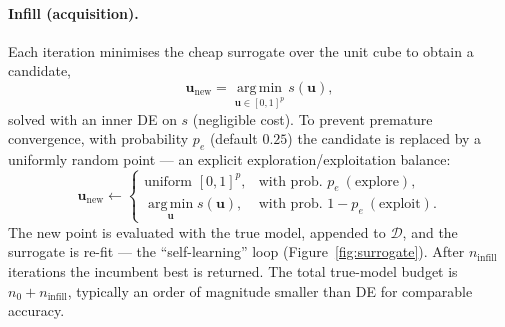 \documentclass[11pt]{article}
\begin{document}
\paragraph{Infill (acquisition).} Each iteration minimises the cheap surrogate over
the unit cube to obtain a candidate,
\begin{equation}
  \bm{u}_{\mathrm{new}}=\operatorname*{arg\,min}_{\bm{u}\in[0,1]^p} s(\bm{u}),
  \label{eq:infill}
\end{equation}
solved with an inner DE on $s$ (negligible cost). To prevent premature
convergence, with probability $p_e$ (default $0.25$) the candidate is replaced by a
uniformly random point --- an explicit exploration/exploitation balance:
\begin{equation}
  \bm{u}_{\mathrm{new}}\leftarrow
  \begin{cases}
    \text{uniform } [0,1]^p, & \text{with prob. } p_e \ (\text{explore}),\\[2pt]
    \operatorname*{arg\,min}_{\bm u} s(\bm u), & \text{with prob. } 1-p_e \ (\text{exploit}).
  \end{cases}
\end{equation}
The new point is evaluated with the true model, appended to $\mathcal{D}$, and the
surrogate is re-fit --- the ``self-learning'' loop (Figure~\ref{fig:surrogate}).
After $n_{\mathrm{infill}}$ iterations the incumbent best is returned. The total
true-model budget is $n_0+n_{\mathrm{infill}}$, typically an order of magnitude
smaller than DE for comparable accuracy.
\end{document}
